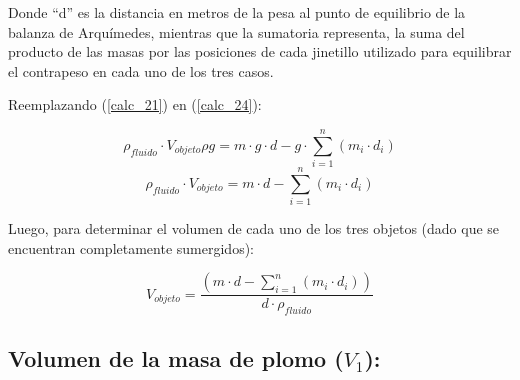 \documentclass[../main.tex]{subfiles}
\begin{document}
Donde “d” es la distancia en metros de la pesa al punto de
equilibrio de la balanza de Arquímedes, mientras que la 
sumatoria representa, la suma del producto de las masas por 
las posiciones de cada jinetillo utilizado para equilibrar el 
contrapeso en cada uno de los tres casos.

Reemplazando (\ref{calc_21}) en (\ref{calc_24}):

\[\rho_{fluido}\cdot V_{objeto}\rho g=m\cdot g\cdot d-g\cdot\sum_{i=1}^n (m_i\cdot d_i ) \]
\[\rho_{fluido}\cdot V_{objeto}=m\cdot d-\sum_{i=1}^n (m_i\cdot d_i ) \]

Luego, para determinar el volumen de cada uno de los tres objetos (dado que se encuentran completamente sumergidos):

\begin{equation} \label{calc_25}
    V_{objeto}=\frac{(m\cdot d -\sum_{i=1}^n (m_i\cdot d_i ) )}{d\cdot \rho_{fluido}} 
\end{equation}

\subsection{Volumen de la masa de plomo ($V_1$):}
\end{document}
